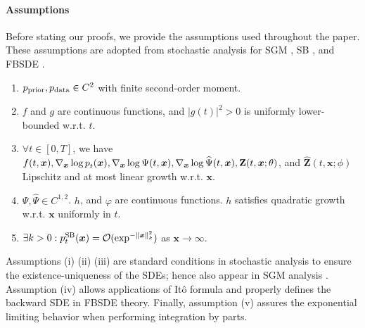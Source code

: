 \documentclass{article}
\def\rvZ{{\mathbf{Z}}}
\def\vx{{\bm{x}}}
\newcommand{\pdata}{p_{\rm{data}}}
\newcommand{\norm}[1]{\lVert#1\rVert}
\def\calO{{\cal O}}
\begin{document}
{
\paragraph*{Assumptions}
Before stating our proofs, we provide the assumptions used throughout the paper.
These assumptions are adopted from stochastic analysis for SGM \citep{song2021maximum,yong1999stochastic,anderson1982reverse}, SB \citep{caluya2021wasserstein}, and FBSDE \citep{exarchos2018stochastic,gorodetsky2015efficient}.
\begin{enumerate}[label=(\roman*)]
  \item $\prior, \pdata \in C^{2}$ with finite second-order moment. \label{assum:i}

  \item $f$ and $g$ are continuous functions, and $|g(t)|^2>0$ is uniformly lower-bounded w.r.t. $t$.

  \item $\forall t\in[0,T]$, we have
        $f(t,\vx), \nabla_\vx \log \pp{t}{}(\vx), \nabla_\vx \log \Psi(t,\vx), \nabla_\vx \log \widehat{\Psi}(t,\vx), \rvZ(t,\vx;\theta)$, and $\widehat{\rvZ}(t,\vx;\phi)$
        Lipschitz and at most linear growth w.r.t. $\vx$.

  \item $\Psi, \widehat{\Psi} \in C^{1,2}$. $h$, and $\varphi$ are continuous functions. $h$ satisfies quadratic growth w.r.t. $\vx$ uniformly in $t$.


  \item $\exists k>0: \pp{t}{SB}(\vx) = \calO(\exp^{-\norm{\vx}_k^2})$ as $\vx \rightarrow \infty$. \label{assum:v}

\end{enumerate}
Assumptions (i) (ii) (iii) are standard conditions in stochastic analysis to ensure the existence-uniqueness of the SDEs; hence also appear in SGM analysis \citep{song2021maximum}.
Assumption (iv) allows applications of It{\^o} formula and properly defines the backward SDE in FBSDE theory.
Finally, assumption (v) assures the exponential limiting behavior when performing integration by parts.
}
\end{document}
